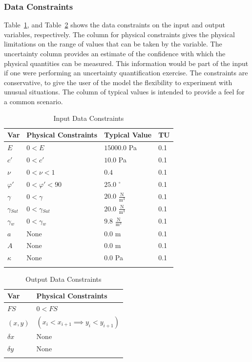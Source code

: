 \documentclass[12pt]{article}
\begin{document}
\subsubsection{Data Constraints}
\label{Sec:DataCons}
Table~\ref{Table:InpuDataCons}, and Table~\ref{Table:OutpDataCons} shows the data constraints on the input and output variables, respectively. The column for physical constraints gives the physical limitations on the range of values that can be taken by the variable. The uncertainty column provides an estimate of the confidence with which the physical quantities can be measured. This information would be part of the input if one were performing an uncertainty quantification exercise. The constraints are conservative, to give the user of the model the flexibility to experiment with unusual situations. The column of typical values is intended to provide a feel for a common scenario.
\begin{longtable}{l l l l}
\toprule
Var & Physical Constraints & Typical Value & TU
\\
\midrule
$E$ & $0<E$ & $15000.0$ Pa & 0.1
\\
$c'$ & $0<c'$ & $10.0$ Pa & 0.1
\\
$\nu{}$ & $0<\nu{}<1$ & $0.4$ & 0.1
\\
$\varphi{}'$ & $0<\varphi{}'<90$ & $25.0$ ${}^{\circ}$ & 0.1
\\
$\gamma{}$ & $0<\gamma{}$ & $20.0$ $\frac{\text{N}}{\text{m}^{3}}$ & 0.1
\\
${\gamma{}_{Sat}}$ & $0<{\gamma{}_{Sat}}$ & $20.0$ $\frac{\text{N}}{\text{m}^{3}}$ & 0.1
\\
${\gamma{}_{w}}$ & $0<{\gamma{}_{w}}$ & $9.8$ $\frac{\text{N}}{\text{m}^{3}}$ & 0.1
\\
$a$ & None & $0.0$ m & 0.1
\\
$A$ & None & $0.0$ m & 0.1
\\
$\kappa{}$ & None & $0.0$ Pa & 0.1
\\
\bottomrule
\caption{Input Data Constraints}
\label{Table:InpuDataCons}
\end{longtable}
\begin{longtable}{l l}
\toprule
Var & Physical Constraints
\\
\midrule
$FS$ & $0<FS$
\\
$(x,y)$ & $\left(x_{i}<x_{i+1}\implies{}y_{i}<y_{i+1}\right)$
\\
$\delta{}x$ & None
\\
$\delta{}y$ & None
\\
\bottomrule
\caption{Output Data Constraints}
\label{Table:OutpDataCons}
\end{longtable}
\end{document}
